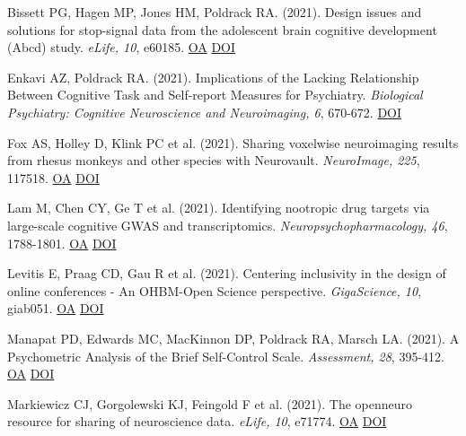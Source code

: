 \documentclass[10pt, letterpaper]{article}
\begin{document}
Bissett PG, Hagen MP, Jones HM, Poldrack RA.  (2021). Design issues and solutions for stop-signal data from the adolescent brain cognitive development (Abcd) study. \textit{eLife, 10}, e60185. \href{https://www.ncbi.nlm.nih.gov/pmc/articles/PMC7997655}{OA} \href{https://doi.org/10.7554/elife.60185}{DOI} \vspace{2mm}

Enkavi AZ, Poldrack RA.  (2021). Implications of the Lacking Relationship Between Cognitive Task and Self-report Measures for Psychiatry. \textit{Biological Psychiatry: Cognitive Neuroscience and Neuroimaging, 6}, 670-672. \href{https://doi.org/10.1016/j.bpsc.2020.06.010}{DOI} \vspace{2mm}

Fox AS, Holley D, Klink PC et al. (2021). Sharing voxelwise neuroimaging results from rhesus monkeys and other species with Neurovault. \textit{NeuroImage, 225}, 117518. \href{https://www.ncbi.nlm.nih.gov/pmc/articles/PMC7846271}{OA} \href{https://doi.org/10.1016/j.neuroimage.2020.117518}{DOI} \vspace{2mm}

Lam M, Chen CY, Ge T et al. (2021). Identifying nootropic drug targets via large-scale cognitive GWAS and transcriptomics. \textit{Neuropsychopharmacology, 46}, 1788-1801. \href{https://www.ncbi.nlm.nih.gov/pmc/articles/PMC8357785}{OA} \href{https://doi.org/10.1038/s41386-021-01023-4}{DOI} \vspace{2mm}

Levitis E, Praag CD, Gau R et al. (2021). Centering inclusivity in the design of online conferences - An OHBM-Open Science perspective. \textit{GigaScience, 10}, giab051. \href{https://www.ncbi.nlm.nih.gov/pmc/articles/PMC8377301}{OA} \href{https://doi.org/10.1093/gigascience/giab051}{DOI} \vspace{2mm}

Manapat PD, Edwards MC, MacKinnon DP, Poldrack RA, Marsch LA.  (2021). A Psychometric Analysis of the Brief Self-Control Scale. \textit{Assessment, 28}, 395-412. \href{https://www.ncbi.nlm.nih.gov/pmc/articles/PMC7261631}{OA} \href{https://doi.org/10.1177/1073191119890021}{DOI} \vspace{2mm}

Markiewicz CJ, Gorgolewski KJ, Feingold F et al. (2021). The openneuro resource for sharing of neuroscience data. \textit{eLife, 10}, e71774. \href{https://www.ncbi.nlm.nih.gov/pmc/articles/PMC8550750}{OA} \href{https://doi.org/10.7554/elife.71774}{DOI} \vspace{2mm}
\end{document}
